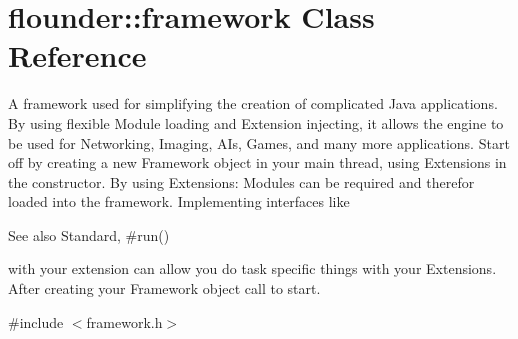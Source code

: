 \hypertarget{classflounder_1_1framework}{}\section{flounder\+:\+:framework Class Reference}
\label{classflounder_1_1framework}


A framework used for simplifying the creation of complicated Java applications. By using flexible Module loading and Extension injecting, it allows the engine to be used for Networking, Imaging, A\+Is, Games, and many more applications. Start off by creating a new Framework object in your main thread, using Extensions in the constructor. By using Extensions\+: Modules can be required and therefor loaded into the framework. Implementing interfaces like \begin{DoxySeeAlso}{See also}
Standard, \#run()


\end{DoxySeeAlso}
with your extension can allow you do task specific things with your Extensions. After creating your Framework object call  to start.  




{\ttfamily \#include $<$framework.\+h$>$}

